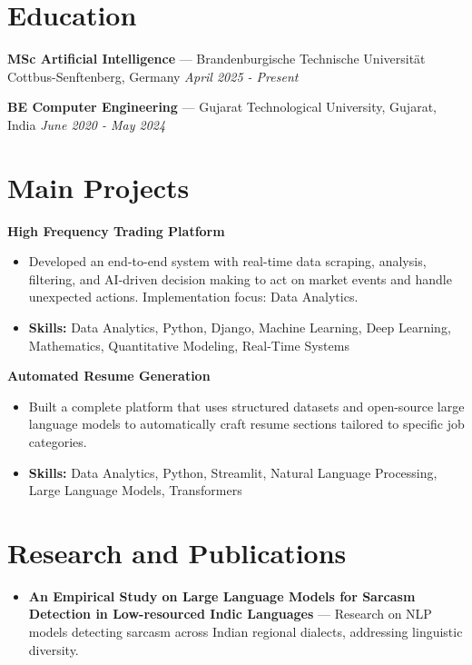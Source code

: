 \documentclass[a4paper,10pt]{article}
\begin{document}
\section*{Education}
\textbf{MSc Artificial Intelligence} — Brandenburgische Technische Universität Cottbus-Senftenberg, Germany \hfill \textit{April 2025 - Present}\par
\vspace{1.5pt}
\textbf{BE Computer Engineering} — Gujarat Technological University, Gujarat, India \hfill \textit{June 2020 - May 2024}\par

\section*{Main Projects}
\textbf{High Frequency Trading Platform}\par
\vspace{1pt}
\begin{itemize}
  \item Developed an end-to-end system with real-time data scraping, analysis, filtering, and AI-driven decision making to act on market events and handle unexpected actions. Implementation focus: Data Analytics.
  \item \textbf{Skills:} Data Analytics, Python, Django, Machine Learning, Deep Learning, Mathematics, Quantitative Modeling, Real-Time Systems
\end{itemize}
\vspace{3pt}
\textbf{Automated Resume Generation}\par
\vspace{1pt}
\begin{itemize}
  \item Built a complete platform that uses structured datasets and open-source large language models to automatically craft resume sections tailored to specific job categories.
  \item \textbf{Skills:} Data Analytics, Python, Streamlit, Natural Language Processing, Large Language Models, Transformers
\end{itemize}

\section*{Research and Publications}
\begin{itemize}
\item \textbf{An Empirical Study on Large Language Models for Sarcasm Detection in Low-resourced Indic Languages} — Research on NLP models detecting sarcasm across Indian regional dialects, addressing linguistic diversity.
\end{itemize}
\end{document}

